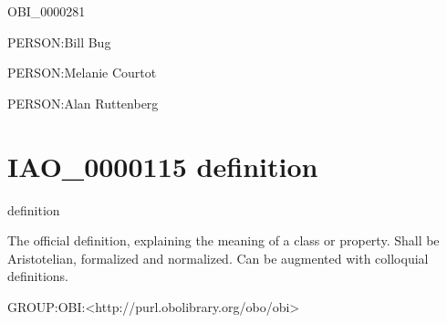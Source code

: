 \documentclass[letterpaper,10pt,english]{sphinxmanual}
\begin{document}
\begin{sphinxShadowBox}

\sphinxAtStartPar
OBI\_0000281
\end{sphinxShadowBox}

\begin{sphinxShadowBox}

\sphinxAtStartPar
PERSON:Bill Bug

\sphinxAtStartPar
PERSON:Melanie Courtot

\sphinxAtStartPar
PERSON:Alan Ruttenberg
\end{sphinxShadowBox}
\begin{quote}
\label{\detokenize{doc-IAO_0000115:iao-0000115}}\label{\detokenize{doc-IAO_0000115:definition}}\label{\detokenize{doc-IAO_0000115:iao-0000115}}
\ignorespaces \end{quote}


\section{IAO\_0000115 \sphinxhyphen{} definition}
\label{\detokenize{doc-IAO_0000115:iao-0000115-definition}}\label{\detokenize{doc-IAO_0000115:index-0}}\label{\detokenize{doc-IAO_0000115::doc}}
\begin{sphinxShadowBox}

\sphinxAtStartPar
definition
\end{sphinxShadowBox}

\begin{sphinxShadowBox}

\sphinxAtStartPar
The official definition, explaining the meaning of a class or property. Shall be Aristotelian, formalized and normalized. Can be augmented with colloquial definitions.
\end{sphinxShadowBox}

\begin{sphinxShadowBox}

\sphinxAtStartPar
GROUP:OBI:\textless{}http://purl.obolibrary.org/obo/obi\textgreater{}
\end{sphinxShadowBox}
\end{document}
